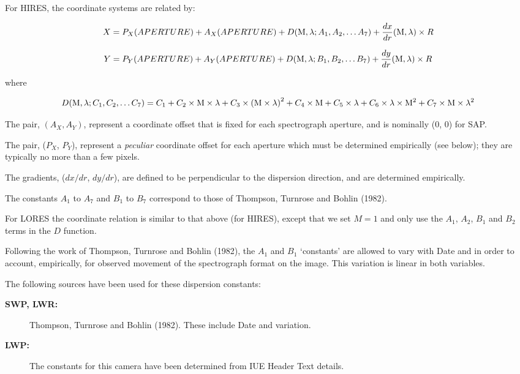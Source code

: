 For HIRES, the coordinate systems are related by:

\begin{displaymath}
X =
P_{X}(APERTURE) +
A_{X}(APERTURE) +
D({\rm M}, \lambda ; A_{1}, A_{2},\ldots A_{7}) +
\frac{dx}{dr}({\rm M}, \lambda) \times R
\end{displaymath}

\begin{displaymath}
Y =
P_{Y}(APERTURE) +
A_{Y}(APERTURE) +
D({\rm M}, \lambda ; B_{1}, B_{2},\dots B_{7}) +
\frac{dy}{dr}({\rm M}, \lambda) \times R
\end{displaymath}

where

\begin{displaymath}
D({\rm M}, \lambda; C_{1}, C_{2},\ldots C_{7}) =
C_{1} +
C_{2}\times {\rm M} \times \lambda +
C_{3}\times {({\rm M} \times \lambda)}^{2} +
C_{4}\times {\rm M} +
C_{5}\times \lambda +
C_{6}\times \lambda \times {\rm M}^{2} +
C_{7}\times {\rm M} \times \lambda^{2}
\end{displaymath}

The pair, $(A_{X}, A_{Y})$, represent a coordinate offset that is fixed for each
spectrograph aperture, and is nominally (0, 0) for SAP\@.

The pair, ($P_{X}$, $P_{Y}$), represent a {\em peculiar} coordinate offset for
each aperture which must be determined empirically (see below); they are
typically no more than a few pixels.

The gradients, ($dx/dr$, $dy/dr$), are defined to be perpendicular to the
dispersion direction, and are determined empirically.

The constants $A_{1}$ to $A_{7}$ and $B_{1}$ to $B_{7}$ correspond to those of
Thompson, Turnrose and Bohlin (1982)\@.

For LORES the coordinate relation is similar to that above (for HIRES),
except that we set $M=1$ and only use the $A_{1}$, $A_{2}$, $B_{1}$ and $B_{2}$
terms in the $D$ function.

Following the work of Thompson, Turnrose and Bohlin (1982), the $A_{1}$ and
$B_{1}$ `constants' are allowed to vary with Date and
 in order to
account, empirically, for observed movement of the spectrograph format on the
image.  This variation is linear in both variables.

The following sources have been used for these dispersion constants:

\begin{description}

\item [{\bf SWP, LWR:}]
      Thompson, Turnrose and Bohlin (1982)\@.  These include Date
      and  variation.

\item [{\bf LWP:}]
      The constants for this camera have been determined from IUE
      Header Text details.

\end{description}

